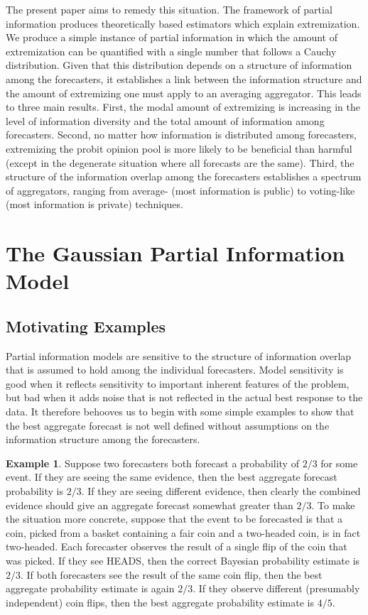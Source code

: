 \documentclass[11pt]{article}
\theoremstyle{definition}
\newtheorem{example}[theorem]{Example}
\theoremstyle{definition}
\begin{document}
The present paper aims to remedy this situation.  The framework of
partial information produces theoretically based estimators which
explain extremization.  We produce a simple instance of partial
information in which the amount of extremization can be quantified
with a single number that follows a Cauchy distribution.  Given that
this distribution depends on a structure of information among the
forecasters, it establishes a link between the information structure
and the amount of extremizing one must apply to an averaging
aggregator.  This leads to three main results.  First, the modal
amount of extremizing is increasing in the level of information
diversity and the total amount of information among forecasters.
Second, no matter how information is distributed among forecasters,
extremizing the probit opinion pool is more likely to be beneficial
than harmful (except in the degenerate situation where all forecasts
are the same). Third, the structure of the information overlap among
the forecasters establishes a spectrum of aggregators, ranging from
average- (most information is public) to voting-like (most information
is private) techniques.


\section{The Gaussian Partial Information Model}
\label{sec:model}

\subsection{Motivating Examples}

Partial information models are sensitive to the structure of
information overlap that is assumed to hold among the individual
forecasters.  Model sensitivity is good when it reflects sensitivity
to important inherent features of the problem, but bad when it adds
noise that is not reflected in the actual best response to the data.
It therefore behooves us to begin with some simple examples to show
that the best aggregate forecast is not well defined without
assumptions on the information structure among the forecasters.

\begin{example}
\label{FirstExample}
Suppose two forecasters both forecast a probability of $2/3$ for some
event.  If they are seeing the same evidence, then the best aggregate
forecast probability is $2/3$.  If they are seeing different evidence,
then clearly the combined evidence should give an aggregate forecast
somewhat greater than $2/3$.  To make the situation more concrete,
suppose that the event to be forecasted is that a coin, picked from a
basket containing a fair coin and a two-headed coin, is in fact
two-headed.  Each forecaster observes the result of a single flip of
the coin that was picked.  If they see HEADS, then the correct
Bayesian probability estimate is $2/3$.  If both forecasters see the
result of the same coin flip, then the best aggregate probability
estimate is again $2/3$.  If they observe different (presumably
independent) coin flips, then the best aggregate probability estimate
is $4/5$.
\end{example}
\end{document}
